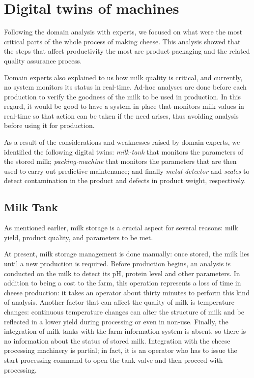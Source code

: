 \section{Digital twins of machines}
Following the domain analysis with experts, we focused on what were the most critical parts of the whole process of making cheese.
This analysis showed that the steps that affect productivity the most are product packaging and the related quality assurance process.

Domain experts also explained to us how milk quality is critical, and currently, no system monitors its status in real-time.
Ad-hoc analyses are done before each production to verify the goodness of the milk to be used in production.
In this regard, it would be good to have a system in place that monitors milk values in real-time so that action can be taken if the need arises,
thus avoiding analysis before using it for production.


As a result of the considerations and weaknesses raised by domain experts, we identified the following digital twins:
\textit{milk-tank} that monitors the parameters of the stored milk; \textit{packing-machine} that monitors the parameters that are then used to carry
out predictive maintenance; and finally \textit{metal-detector} and \textit{scales} to detect contamination in the product and defects in product weight, respectively.

\subsection{Milk Tank}
As mentioned earlier, milk storage is a crucial aspect for several reasons: milk yield, product quality, and parameters to be met.

At present, milk storage management is done manually: once stored, the milk lies until a new production is required.
Before production begins, an analysis is conducted on the milk to detect its pH, protein level and other parameters.
In addition to being a cost to the farm, this operation represents a loss of time in cheese production: it takes an operator about thirty minutes to
perform this kind of analysis.
Another factor that can affect the quality of milk is temperature changes: continuous temperature changes can alter the structure of milk and be 
reflected in a lower yield during processing or even in non-use.
Finally, the integration of milk tanks with the farm information system is absent, so there is no information about the status of stored milk.
Integration with the cheese processing machinery is partial; in fact, it is an operator who has to issue the start processing command to open the 
tank valve and then proceed with processing.

